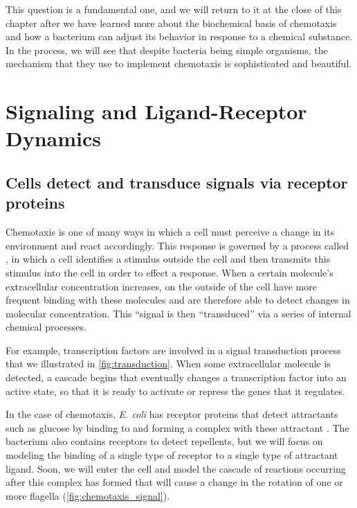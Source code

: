 This question is a fundamental one, and we will return to it at the close of this chapter after we have learned more about the biochemical basis of chemotaxis and how a bacterium can adjust its behavior in response to a chemical substance. In the process, we will see that despite bacteria being simple organisms, the mechanism that they use to implement chemotaxis is sophisticated and beautiful.\\


\FloatBarrier
{}
\section{Signaling and Ligand-Receptor Dynamics}
\label{sec:signal}

\subsection{Cells detect and transduce signals via receptor proteins}

Chemotaxis is one of many ways in which a cell must perceive a change in its environment and react accordingly. This response is governed by a process called , in which a cell identifies a stimulus outside the cell and then transmits this stimulus into the cell in order to effect a response. When a certain molecule's extracellular concentration increases,  on the outside of the cell have more frequent binding with these molecules and are therefore able to detect changes in molecular concentration. This ``signal is then ``transduced'' via a series of internal chemical processes.

For example, transcription factors are involved in a signal transduction process that we illustrated in \autoref{fig:transduction}. When some extracellular molecule is detected, a cascade begins that eventually changes a transcription factor into an active state, so that it is ready to activate or repress the genes that it regulates.

In the case of chemotaxis, \textit{E. coli} has receptor proteins that detect attractants such as glucose by binding to and forming a complex with these attractant . The bacterium also contains receptors to detect repellents, but we will focus on modeling the binding of a single type of receptor to a single type of attractant ligand. Soon, we will enter the cell and model the cascade of reactions occurring after this complex has formed that will cause a change in the rotation of one or more flagella (\autoref{fig:chemotaxis_signal}).\\

